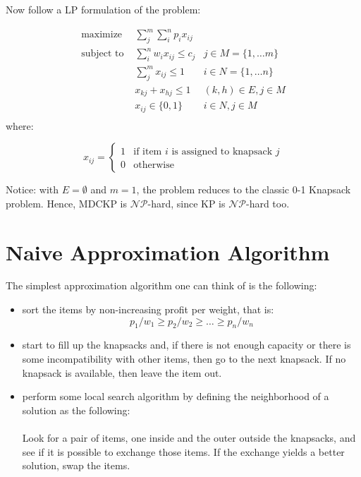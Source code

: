 \documentclass[]{article}
\begin{document}
Now follow a LP formulation of the problem:

\begin{align*}
\text{maximize }   & \sum_j^m \sum_i^n p_i x_{ij} 	&\\
\text{subject to } & \sum_i^n w_i x_{ij} \le c_j 	& j \in M = \{1, \dots m\}\\
				   & \sum_j^m x_{ij} \le 1 			& i \in N = \{1, \dots n\}\\
				   & x_{kj} + x_{hj} \le 1			& (k, h)\in E, j\in M\\
				   & x_{ij} \in \{0, 1\} 			& i \in N, j \in M\\
\end{align*}
where:

\begin{equation*}
x_{ij} = \begin{cases}
	1 & \text{if item $i$ is assigned to knapsack $j$} \\
	0 & \text{otherwise}
\end{cases}
\end{equation*}

Notice: with $E=\emptyset$ and $m=1$, the problem reduces to the classic 0-1 Knapsack problem. Hence, MDCKP is $\mathcal{NP}$-hard, since KP is $\mathcal{NP}$-hard too.

\section{Naive Approximation Algorithm}
The simplest approximation algorithm one can think of is the following:
\begin{itemize}
	\item sort the items by non-increasing profit per weight, that is:
	\begin{equation*}
		p_1/w_1 \ge p_2/w_2 \ge \dots \ge p_n/w_n
	\end{equation*}
	\item start to fill up the knapsacks and, if there is not enough capacity or there is some incompatibility with other items, then go to the next knapsack. If no knapsack is available, then leave the item out.
	\item perform some local search algorithm by defining the neighborhood of a solution as the following:
	
	\paragraph{} Look for a pair of items, one inside and the outer outside the knapsacks, and see if it is possible to exchange those items. If the exchange yields a better solution, swap the items.
	
\end{itemize}
\end{document}
